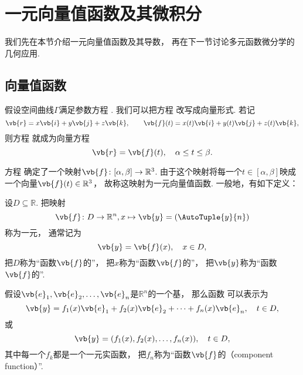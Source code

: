 \section{一元向量值函数及其微积分}
我们先在本节介绍一元向量值函数及其导数，
再在下一节讨论多元函数微分学的几何应用.

\subsection{向量值函数}
假设空间曲线\(\Gamma\)满足参数方程 .
我们可以把方程  改写成向量形式.
若记\[
	\vb{r}=x\vb{i}+y\vb{j}+z\vb{k},
	\qquad
	\vb{f}(t)=x(t)\vb{i}+y(t)\vb{j}+z(t)\vb{k},
\]
则方程 
就成为向量方程\begin{equation}\label{equation:解析几何.曲面的参数方程.向量形式}
	\vb{r}=\vb{f}(t),
	\quad \alpha \leq t \leq \beta.
\end{equation}

方程 
确定了一个映射\(\vb{f}\colon [\alpha,\beta]\to\mathbb{R}^3\).
由于这个映射将每一个\(t\in[\alpha,\beta]\)映成一个向量\(\vb{f}(t)\in\mathbb{R}^3\)，
故称这映射为一元向量值函数.
一般地，有如下定义：
\begin{definition}
设\(D \subseteq \mathbb{R}\).
把映射\[
	\vb{f}\colon D\to\mathbb{R}^n,
	x \mapsto \vb{y}=(\AutoTuple{y}{n})
\]称为一元，
通常记为\begin{equation}\label{equation:一元实变向量值函数.向量形式}
	\vb{y}=\vb{f}(x),
	\quad x \in D,
\end{equation}
把\(D\)称为“函数\(\vb{f}\)的”，
把\(x\)称为“函数\(\vb{f}\)的”，
把\(\vb{y}\)称为“函数\(\vb{f}\)的”.
\end{definition}

假设\(\vb{e}_1,\vb{e}_2,\dotsc,\vb{e}_n\)是\(\mathbb{R}^n\)的一个基，
那么函数  可以表示为\begin{equation}
	\vb{y}=f_1(x)\vb{e}_1+f_2(x)\vb{e}_2+\dotsb+f_n(x)\vb{e}_n,
	\quad t \in D,
\end{equation}
或\begin{equation}
	\vb{y}=(f_1(x),f_2(x),\dotsc,f_n(x)),
	\quad t \in D,
\end{equation}
其中每一个\(f_k\)都是一个一元实函数，
把\(f_n\)称为“函数\(\vb{f}\)的（component function）”.

